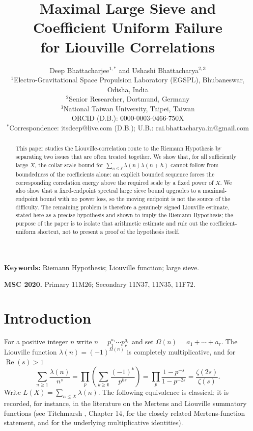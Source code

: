 \documentclass[11pt]{article}
\title{\textbf{Maximal Large Sieve and Coefficient Uniform Failure\\ for Liouville Correlations}}
\author{
Deep Bhattacharjee$^{1,*}$ and Ushashi Bhattacharya$^{2,3}$\\[4pt]
\small $^{1}$Electro-Gravitational Space Propulsion Laboratory (EGSPL), Bhubaneswar, Odisha, India\\
\small $^{2}$Senior Researcher, Dortmund, Germany\\
\small $^{3}$National Taiwan University, Taipei, Taiwan\\[4pt]
\small ORCID (D.B.): 0000-0003-0466-750X\\
\small $^{*}$Correspondence: itsdeep@live.com (D.B.); U.B.: rai.bhattacharya.in@gmail.com
}
\date{}
\begin{document}
\maketitle

\begin{abstract}
\noindent
This paper studies the Liouville-correlation route to the Riemann Hypothesis by separating two issues that
are often treated together. We show that, for all sufficiently large $X$, the collar-scale bound for
$\sum_{n\le Y}\lambda(n)\lambda(n+h)$ cannot follow from boundedness of the coefficients alone: an explicit
bounded sequence forces the corresponding correlation energy above the required scale by a fixed power of
$X$. We also show that a fixed-endpoint spectral large sieve bound upgrades to a maximal-endpoint bound
with no power loss, so the moving endpoint is not the source of the difficulty. The remaining problem is
therefore a genuinely signed Liouville estimate, stated here as a precise hypothesis and shown to imply the
Riemann Hypothesis; the purpose of the paper is to isolate that arithmetic estimate and rule out the
coefficient-uniform shortcut, not to present a proof of the hypothesis itself.
\end{abstract}

\noindent\textbf{Keywords:} Riemann Hypothesis; Liouville function; large sieve.

\noindent\textbf{MSC 2020.} Primary 11M26; Secondary 11N37, 11N35, 11F72.

\section{Introduction}

For a positive integer $n$ write $n=p_1^{a_1}\cdots p_r^{a_r}$ and set $\Omega(n)=a_1+\cdots+a_r$. The
Liouville function $\lambda(n)=(-1)^{\Omega(n)}$ is completely multiplicative, and for $\operatorname{Re}(s)>1$
\begin{equation}
\sum_{n\ge1}\frac{\lambda(n)}{n^s}=\prod_p\left(\sum_{k\ge0}\frac{(-1)^k}{p^{ks}}\right)
=\prod_p\frac{1-p^{-s}}{1-p^{-2s}}=\frac{\zeta(2s)}{\zeta(s)}.
\label{eq:euler}
\end{equation}
Write $L(X)=\sum_{n\le X}\lambda(n)$. The following equivalence is classical; it is recorded, for
instance, in the literature on the Mertens and Liouville summatory functions (see Titchmarsh
\cite{titchmarsh}, Chapter 14, for the closely related Mertens-function statement, and
\cite{apostol} for the underlying multiplicative identities).
\end{document}
